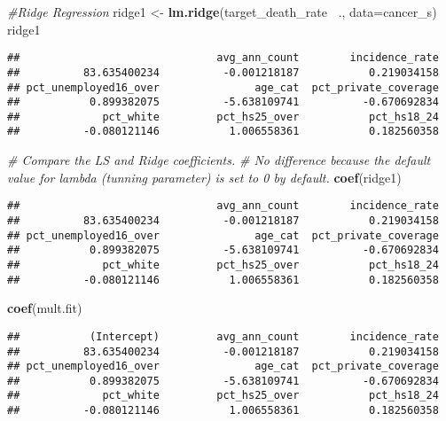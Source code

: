 \documentclass[]{article}
\newenvironment{Shaded}{\begin{snugshade}}{\end{snugshade}}
\newcommand{\KeywordTok}[1]{\textcolor[rgb]{0.13,0.29,0.53}{\textbf{#1}}}
\newcommand{\DataTypeTok}[1]{\textcolor[rgb]{0.13,0.29,0.53}{#1}}
\newcommand{\StringTok}[1]{\textcolor[rgb]{0.31,0.60,0.02}{#1}}
\newcommand{\CommentTok}[1]{\textcolor[rgb]{0.56,0.35,0.01}{\textit{#1}}}
\newcommand{\OperatorTok}[1]{\textcolor[rgb]{0.81,0.36,0.00}{\textbf{#1}}}
\newcommand{\NormalTok}[1]{#1}
\begin{document}
\begin{Shaded}
\begin{Highlighting}[]
\CommentTok{#Ridge Regression}
\NormalTok{ridge1 <-}\StringTok{ }\KeywordTok{lm.ridge}\NormalTok{(target_death_rate }\OperatorTok{~}\NormalTok{., }\DataTypeTok{data=}\NormalTok{cancer_s)}
\NormalTok{ridge1}
\end{Highlighting}
\end{Shaded}

\begin{verbatim}
##                               avg_ann_count        incidence_rate 
##          83.635400234          -0.001218187           0.219034158 
## pct_unemployed16_over               age_cat  pct_private_coverage 
##           0.899382075          -5.638109741          -0.670692834 
##             pct_white         pct_hs25_over           pct_hs18_24 
##          -0.080121146           1.006558361           0.182560358
\end{verbatim}

\begin{Shaded}
\begin{Highlighting}[]
\CommentTok{# Compare the LS and Ridge coefficients.}
\CommentTok{# No difference because the default value for lambda (tunning parameter) is set to 0 by default.}
\KeywordTok{coef}\NormalTok{(ridge1)}
\end{Highlighting}
\end{Shaded}

\begin{verbatim}
##                               avg_ann_count        incidence_rate 
##          83.635400234          -0.001218187           0.219034158 
## pct_unemployed16_over               age_cat  pct_private_coverage 
##           0.899382075          -5.638109741          -0.670692834 
##             pct_white         pct_hs25_over           pct_hs18_24 
##          -0.080121146           1.006558361           0.182560358
\end{verbatim}

\begin{Shaded}
\begin{Highlighting}[]
\KeywordTok{coef}\NormalTok{(mult.fit)}
\end{Highlighting}
\end{Shaded}

\begin{verbatim}
##           (Intercept)         avg_ann_count        incidence_rate 
##          83.635400234          -0.001218187           0.219034158 
## pct_unemployed16_over               age_cat  pct_private_coverage 
##           0.899382075          -5.638109741          -0.670692834 
##             pct_white         pct_hs25_over           pct_hs18_24 
##          -0.080121146           1.006558361           0.182560358
\end{verbatim}
\end{document}
